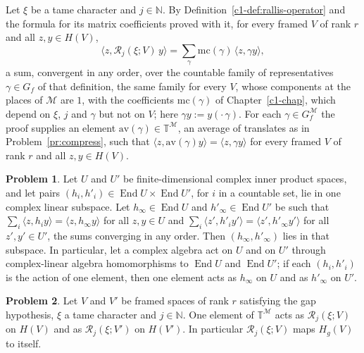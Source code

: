 \documentclass[reqno]{amsart}
\newcounter{chap}
\theoremstyle{plain}
\theoremstyle{definition}
\newtheorem{problem}{Problem}[section]
\newcommand{\Mcal}{\mathcal{M}}
\newcommand{\Rc}{\mathcal{R}}
\newcommand{\TM}{\mathbb{T}^{\mathcal{M}}}
\begin{document}
Let \(\xi\) be a tame character and \(j \in \mathbb N\).  By Definition~\ref{c1-def:rallis-operator} and the formula for its matrix coefficients proved with it, for every framed \(V\) of rank \(r\) and all \(z, y \in H(V)\),
\[
  \langle z, \Rc_j(\xi; V)\, y \rangle = \sum_\gamma \mathrm{mc}(\gamma)\, \langle z, \gamma y\rangle ,
\]
a sum, convergent in any order, over the countable family of representatives \(\gamma \in G_f\) of that definition, the same family for every \(V\), whose components at the places of \(\Mcal\) are \(1\), with the coefficients \(\mathrm{mc}(\gamma)\) of Chapter~\ref{c1-chap}, which depend on \(\xi\), \(j\) and \(\gamma\) but not on \(V\); here \(\gamma y := y(\cdot\,\gamma)\).  For each \(\gamma \in G_f^{\Mcal}\) the proof supplies an element \(\mathrm{av}(\gamma) \in \TM\), an average of translates as in Problem~\ref{pr:compress}, such that \(\langle z, \mathrm{av}(\gamma) y\rangle = \langle z, \gamma y\rangle\) for every framed \(V\) of rank \(r\) and all \(z, y \in H(V)\).

\begin{problem}\label{pr:closed}
Let \(U\) and \(U'\) be finite-dimensional complex inner product spaces, and let pairs \((h_i, h'_i) \in \operatorname{End} U \times \operatorname{End} U'\), for \(i\) in a countable set, lie in one complex linear subspace.  Let \(h_\infty \in \operatorname{End} U\) and \(h'_\infty \in \operatorname{End} U'\) be such that \(\sum_i \langle z, h_i y\rangle = \langle z, h_\infty y\rangle\) for all \(z, y \in U\) and \(\sum_i \langle z', h'_i y'\rangle = \langle z', h'_\infty y'\rangle\) for all \(z', y' \in U'\), the sums converging in any order.  Then \((h_\infty, h'_\infty)\) lies in that subspace.  In particular, let a complex algebra act on \(U\) and on \(U'\) through complex-linear algebra homomorphisms to \(\operatorname{End} U\) and \(\operatorname{End} U'\); if each \((h_i, h'_i)\) is the action of one element, then one element acts as \(h_\infty\) on \(U\) and as \(h'_\infty\) on \(U'\).
\end{problem}

\begin{problem}\label{pr:rallis-hecke}
Let \(V\) and \(V'\) be framed spaces of rank \(r\) satisfying the gap hypothesis, \(\xi\) a tame character and \(j \in \mathbb N\).  One element of \(\TM\) acts as \(\Rc_j(\xi; V)\) on \(H(V)\) and as \(\Rc_j(\xi; V')\) on \(H(V')\).  In particular \(\Rc_j(\xi; V)\) maps \(H_g(V)\) to itself.
\end{problem}
\end{document}
